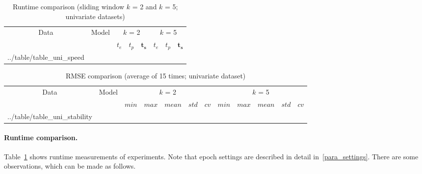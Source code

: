 \documentclass[11pt,twoside]{article}
\makeatletter
\newcommand\primitiveinput[1]
		{\@@input #1 }
\makeatother
\begin{document}
\begin{multicols}{2}
\begin{table}[!t]
	\caption{Runtime comparison (sliding window $k$ = 2 and $k$ = 5; univariate datasets)}
	\label{table:uni_speed}
	\centering
	\begin{adjustbox}{width=0.5\textwidth, angle=270}
	\begin{sideways}
		\begin{tabular}{| c | c | c | c | c | c | c | c |}%
			\hline
			\multirow{2}{*}{Data} & \multirow{2}{*}{Model} & \multicolumn{3}{c|}{$k$ = 2} & \multicolumn{3}{c|}{ $k$ = 5 } \\ \cline{3-8}
   				& & $t_e$ & $t_p$ & $\boldsymbol{t_s}$ & $t_e$ & $t_p$ & $\boldsymbol{t_s}$  \\ [0.5ex] \hline
			\primitiveinput{../table/table_uni_speed}
			\hline
		\end{tabular}
	\end{sideways}
	\end{adjustbox}
\end{table}


\begin{table}[!t]
	\caption{RMSE comparison (average of 15 times; univariate dataset)}
	\label{table:uni_stability}
	\centering
	\begin{adjustbox}{width=0.44\textwidth, angle=270}
	\begin{sideways}
		\begin{tabular}{| c | c| c | c | c | c | c | c | c | c | c | c |}%
		\hline
			 \multirow{2}{*}{Data} & \multirow{2}{*}{Model} & \multicolumn{5}{c|}{$k$ = 2} & \multicolumn{5}{c|}{ $k$ = 5 } \\ 
			 \cline{3-12}
	   		& & $min$ & $max$ & $mean$ & $std$ & $cv$ &   $min$ & $max$ & $mean$ & $std$ & $cv$ \\ [0.5ex] 
		\hline
			\primitiveinput{../table/table_uni_stability}
		\hline
		\end{tabular}
	\end{sideways}
	\end{adjustbox}
\end{table}



\paragraph{\textbf{Runtime comparison.}} Table~\ref{table:uni_speed} shows runtime measurements of experiments. Note that epoch settings are described in detail in~\ref{para_settings}. There are some observations, which can be made as follows.


\end{multicols}
\end{document}
